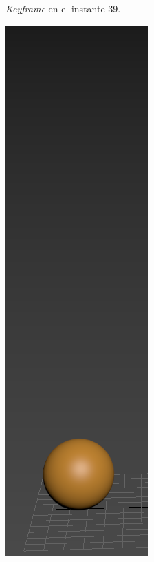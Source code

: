 \documentclass{article}
\begin{document}
\begin{figure}[H]
\begin{subfigure}[H]{0.15\textwidth}
	    \caption{\textit{Keyframe} en el instante 39.}
	\end{subfigure}
    \hfill
	\begin{subfigure}[H]{0.15\textwidth}
	    \centering
	    \includegraphics[width=\textwidth]{imagenes/Ejercicio 2/p1_suelo2.png}

\end{subfigure}
\end{figure}
\end{document}

